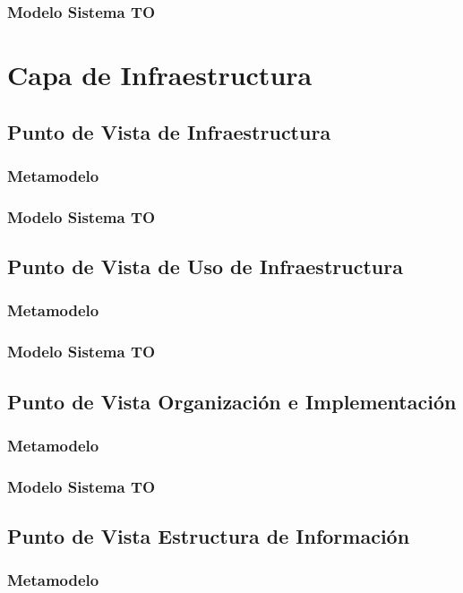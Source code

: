     	\subsubsection{Modelo Sistema TO}
  \section{Capa de Infraestructura}
    \subsection{Punto de Vista de Infraestructura}
    	\subsubsection{Metamodelo}
	    \subsubsection{Modelo Sistema TO}
    \subsection{Punto de Vista de Uso de Infraestructura}
		\subsubsection{Metamodelo}
		\subsubsection{Modelo Sistema TO}
    \subsection{Punto de Vista Organización e Implementación}
		\subsubsection{Metamodelo}
		\subsubsection{Modelo Sistema TO}
    \subsection{Punto de Vista Estructura de Información}
		\subsubsection{Metamodelo}
